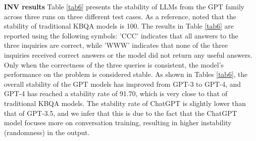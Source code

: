 \documentclass[runningheads]{llncs}
\begin{document}
\begin{table}[t]\centering
\caption{DIR results for AnsType prompting} \label{tab8}
\end{table}

\textbf{INV results}
Table \ref{tab6} presents the stability of LLMs from the GPT family across three runs on three different test cases. As a reference, \cite{omar2023chatgpt} noted that the stability of traditional KBQA models is 100. The results in Table \ref{tab6} are reported using the following symbols: 'CCC' indicates that all answers to the three inquiries are correct, while 'WWW' indicates that none of the three inquiries received correct answers or the model did not return any useful answers. Only when the correctness of the three queries is consistent, the model's performance on the problem is considered stable. As shown in Tables \ref{tab6}, the overall stability of the GPT models has improved from GPT-3 to GPT-4, and GPT-4 has reached a stability rate of 91.70, which is very close to that of traditional KBQA models. The stability rate of ChatGPT is slightly lower than that of GPT-3.5, and we infer that this is due to the fact that the ChatGPT model focuses more on conversation training, resulting in higher instability (randomness) in the output.
\end{document}

